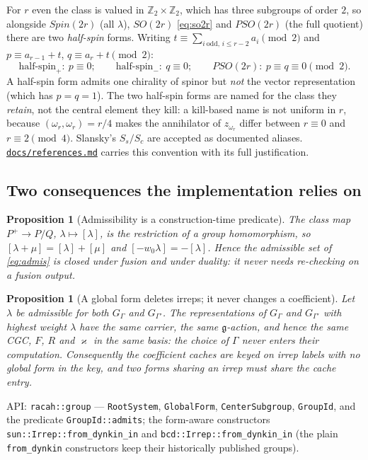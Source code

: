 \documentclass[11pt,a4paper]{article}
\theoremstyle{plain}
\newtheorem{proposition}[theorem]{Proposition}
\theoremstyle{definition}
\newcommand{\g}{\mathfrak{g}}
\newcommand{\ZZ}{\mathbb{Z}}
\newcommand{\code}[1]{\texttt{#1}}
\newcommand{\refsmd}{\href{https://github.com/Ryo-wtnb11/racah/blob/main/docs/references.md}{\code{docs/references.md}}}
\begin{document}
For $r$ even the class is valued in $\ZZ_2\times\ZZ_2$, which has three
subgroups of order $2$, so alongside $Spin(2r)$ (all $\lambda$), $SO(2r)$
\eqref{eq:so2r} and $PSO(2r)$ (the full quotient) there are two
\emph{half-spin} forms. Writing
$t \equiv \sum_{i\ \mathrm{odd},\, i\le r-2} a_i \pmod 2$ and
$p \equiv a_{r-1}+t$, $q \equiv a_r + t \pmod 2$:
\[
  \text{half-spin}_+:\ p \equiv 0;\qquad
  \text{half-spin}_-:\ q \equiv 0;\qquad
  PSO(2r):\ p \equiv q \equiv 0 \pmod 2 .
\]
A half-spin form admits one chirality of spinor but \emph{not} the vector
representation (which has $p=q=1$). The two half-spin forms are named for the
class they \emph{retain}, not the central element they kill: a
kill-based name is not uniform in $r$, because $(\omega_r,\omega_r)=r/4$ makes
the annihilator of $z_{\omega_r}$ differ between $r\equiv0$ and $r\equiv2
\pmod 4$. Slansky's $S_s/S_c$ are accepted as documented aliases. \refsmd{}
carries this convention with its full justification.

\subsection{Two consequences the implementation relies on}

\begin{proposition}[Admissibility is a construction-time predicate]
The class map $P^+\to P/Q$, $\lambda\mapsto[\lambda]$, is the restriction of a
group homomorphism, so $[\lambda+\mu]=[\lambda]+[\mu]$ and
$[-w_0\lambda]=-[\lambda]$. Hence the admissible set of \eqref{eq:admis} is
closed under fusion and under duality: it never needs re-checking on a fusion
output.
\end{proposition}

\begin{proposition}[A global form deletes irreps; it never changes a coefficient]
\label{prop:samecoeff}
Let $\lambda$ be admissible for both $G_\Gamma$ and $G_{\Gamma'}$. The
representations of $G_\Gamma$ and $G_{\Gamma'}$ with highest weight $\lambda$
have the same carrier, the same $\g$-action, and hence the same CGC, $F$, $R$
and $\varkappa$ \emph{in the same basis}: the choice of $\Gamma$ never enters
their computation. Consequently the coefficient caches are keyed on irrep
labels with \emph{no global form in the key}, and two forms sharing an irrep
must share the cache entry.
\end{proposition}

\begin{sloppypar}
API: \code{racah::group} --- \code{RootSystem}, \code{GlobalForm},
\code{CenterSubgroup}, \code{GroupId}, and the predicate
\code{GroupId::admits}; the form-aware constructors
\code{sun::Irrep::from\_dynkin\_in} and \code{bcd::Irrep::from\_dynkin\_in}
(the plain \code{from\_dynkin} constructors keep their historically published
groups).
\end{sloppypar}
\end{document}
